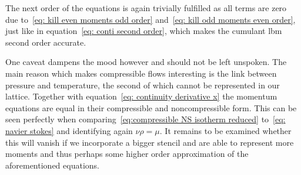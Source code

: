 The next order of the equations is again trivially fulfilled as all terms are zero due to~\eqref{eq: kill even moments odd order} and~\eqref{eq: kill odd moments even order},
just like in equation~\eqref{eq: conti second order}, which makes the cumulant \gls{lbm} second order accurate.

One caveat dampens the mood however and should not be left unspoken.
The main reason which makes compressible flows interesting is the link between pressure and temperature, the second of which cannot be represented in our lattice.
Together with equation~\eqref{eq: continuity derivative x} the momentum equations are equal in their compressible and noncompressible form.
This can be seen perfectly when comparing~\eqref{eq:compressible NS isotherm reduced} to~\eqref{eq: navier stokes} and identifying again $\nu \rho = \mu$.
It remains to be examined whether this will vanish if we incorporate a bigger stencil and are able to represent more moments and thus perhaps some higher order approximation of the aforementioned equations.
